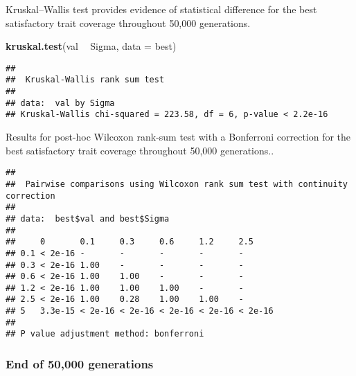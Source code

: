 \documentclass[]{book}
\newenvironment{Shaded}{\begin{snugshade}}{\end{snugshade}}
\newcommand{\DataTypeTok}[1]{\textcolor[rgb]{0.13,0.29,0.53}{#1}}
\newcommand{\KeywordTok}[1]{\textcolor[rgb]{0.13,0.29,0.53}{\textbf{#1}}}
\newcommand{\NormalTok}[1]{#1}
\newcommand{\OperatorTok}[1]{\textcolor[rgb]{0.81,0.36,0.00}{\textbf{#1}}}
\newcommand{\OtherTok}[1]{\textcolor[rgb]{0.56,0.35,0.01}{#1}}
\newcommand{\StringTok}[1]{\textcolor[rgb]{0.31,0.60,0.02}{#1}}
\begin{document}
Kruskal--Wallis test provides evidence of statistical difference for the best satisfactory trait coverage throughout 50,000 generations.

\begin{Shaded}
\begin{Highlighting}[]
\KeywordTok{kruskal.test}\NormalTok{(val }\OperatorTok{~}\StringTok{ }\NormalTok{Sigma, }\DataTypeTok{data =}\NormalTok{ best)}
\end{Highlighting}
\end{Shaded}

\begin{verbatim}
## 
##  Kruskal-Wallis rank sum test
## 
## data:  val by Sigma
## Kruskal-Wallis chi-squared = 223.58, df = 6, p-value < 2.2e-16
\end{verbatim}

Results for post-hoc Wilcoxon rank-sum test with a Bonferroni correction for the best satisfactory trait coverage throughout 50,000 generations..

\begin{Shaded}
\end{Shaded}

\begin{verbatim}
## 
##  Pairwise comparisons using Wilcoxon rank sum test with continuity correction 
## 
## data:  best$val and best$Sigma 
## 
##     0       0.1     0.3     0.6     1.2     2.5    
## 0.1 < 2e-16 -       -       -       -       -      
## 0.3 < 2e-16 1.00    -       -       -       -      
## 0.6 < 2e-16 1.00    1.00    -       -       -      
## 1.2 < 2e-16 1.00    1.00    1.00    -       -      
## 2.5 < 2e-16 1.00    0.28    1.00    1.00    -      
## 5   3.3e-15 < 2e-16 < 2e-16 < 2e-16 < 2e-16 < 2e-16
## 
## P value adjustment method: bonferroni
\end{verbatim}

\hypertarget{end-of-50000-generations-22}{%
\subsubsection{End of 50,000 generations}\label{end-of-50000-generations-22}}
\end{document}
